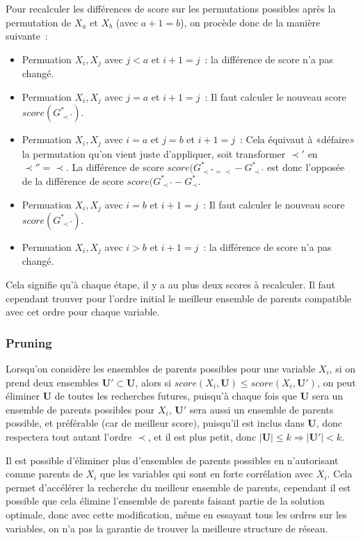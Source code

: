 \documentclass[french,a4paper]{article}
\begin{document}
Pour recalculer les différences de score sur les permutations
possibles après la permutation de $X_a$ et $X_b$ (avec $a + 1 = b$),
on procède donc de la manière suivante~:
\begin{itemize}
\item Permuation $X_i,X_j$ avec $j < a$ et $i+1=j$~: la différence de
  score n'a pas changé.
\item Permuation $X_i,X_j$ avec $j = a$ et $i+1=j$~: Il faut calculer
  le nouveau score $score(G^*_{\prec'})$.
\item Permuation $X_i,X_j$ avec $i = a$ et $j = b$ et $i+1=j$~: Cela
  équivaut à «défaire» la permutation qu'on vient juste d'appliquer,
  soit transformer $\prec'$ en $\prec''=\prec$. La différence de score
  $score(G^*_{\prec'' = \prec}-G^*_{\prec'}$ est donc l'opposée de la
  différence de score $score(G^*_{\prec'}-G^*_{\prec}$.
\item Permuation $X_i,X_j$ avec $i = b$ et $i+1=j$~: Il faut calculer
  le nouveau score $score(G^*_{\prec'})$.
\item Permuation $X_i,X_j$ avec $i > b$ et $i+1=j$~: la différence de
  score n'a pas changé.
\end{itemize}
Cela signifie qu'à chaque étape, il y a au plus deux scores à
recalculer. Il faut cependant trouver pour l'ordre initial le meilleur
ensemble de parents compatible avec cet ordre pour chaque variable.

\subsubsection{Pruning}

Lorsqu'on considère les ensembles de parents possibles pour une
variable $X_i$, si on prend deux ensembles $\mathbf{U}' \subset
\mathbf{U}$, alors si $score(X_i, \mathbf{U}) \leq score(X_i,
\mathbf{U'})$, on peut éliminer $\mathbf{U}$ de toutes les recherches
futures, puisqu'à chaque fois que $\mathbf{U}$ sera un ensemble de
parents possibles pour $X_i$, $\mathbf{U}'$ sera aussi un ensemble de
parents possible, et préférable (car de meilleur score), puisqu'il est
inclus dans $\mathbf{U}$, donc respectera tout autant l'ordre $\prec$,
et il est plus petit, donc $|\mathbf{U}| \leq k \Rightarrow
|\mathbf{U}'| < k$.

Il est possible d'éliminer plus d'ensembles de parents possibles en
n'autorisant comme parents de $X_i$ que les variables qui sont en
forte corrélation avec $X_i$. Cela permet d'accélérer la recherche du
meilleur ensemble de parents, cependant il est possible que cela
élimine l'ensemble de parents faisant partie de la solution optimale,
donc avec cette modification, même en essayant tous les ordres sur les
variables, on n'a pas la garantie de trouver la meilleure structure de
réseau.
\end{document}
